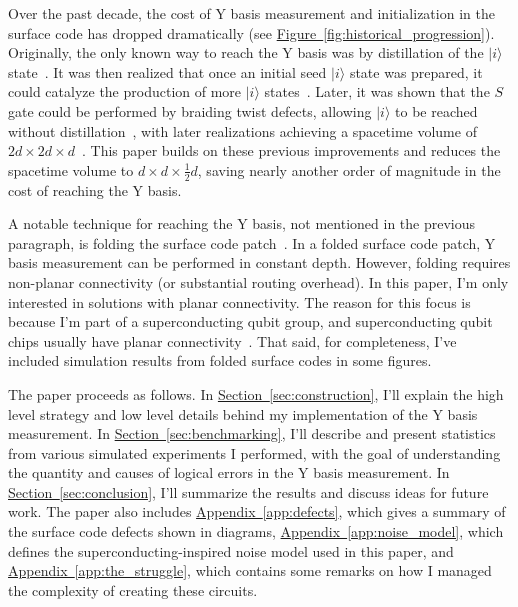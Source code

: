 \documentclass[onecolumn,unpublished,a4paper]{quantumarticle}
\theoremstyle{definition}
\theoremstyle{definition}
\theoremstyle{definition}
\renewcommand{\sec}[1]{\hyperref[sec:#1]{Section~\ref*{sec:#1}}}
\DeclareRobustCommand{\app}[1]{\hyperref[app:#1]{Appendix~\ref*{app:#1}}}
\newcommand{\fig}[1]{\hyperref[fig:#1]{Figure~\ref*{fig:#1}}}
\begin{document}
Over the past decade, the cost of Y basis measurement and initialization in the surface code has dropped dramatically (see \fig{historical_progression}).
Originally, the only known way to reach the Y basis was by distillation of the $|i\rangle$ state~\cite{aliferis2005quantum,fowler2012surfacecodereview,fowler2012bridge}.
It was then realized that once an initial seed $|i\rangle$ state was prepared, it could catalyze the production of more $|i\rangle$ states~\cite{fowler2012surfacecodereview,gidney2017slightly}.
Later, it was shown that the $S$ gate could be performed by braiding twist defects, allowing $|i\rangle$ to be reached without distillation~\cite{brown2017surfacetwists}, with later realizations achieving a spacetime volume of $2d \times 2d \times d$~\cite{bombin2021logical,chamberland2022universal}.
This paper builds on these previous improvements and reduces the spacetime volume to $d \times d \times \frac{1}{2}d$, saving nearly another order of magnitude in the cost of reaching the Y basis.

A notable technique for reaching the Y basis, not mentioned in the previous paragraph, is folding the surface code patch~\cite{moussa2016folded}.
In a folded surface code patch, Y basis measurement can be performed in constant depth.
However, folding requires non-planar connectivity (or substantial routing overhead).
In this paper, I'm only interested in solutions with planar connectivity.
The reason for this focus is because I'm part of a superconducting qubit group, and superconducting qubit chips usually have planar connectivity~\cite{Andersen2020,googlerepcode2021,Zhao2022}.
That said, for completeness, I've included simulation results from folded surface codes in some figures.

The paper proceeds as follows.
In \sec{construction}, I'll explain the high level strategy and low level details behind my implementation of the Y basis measurement.
In \sec{benchmarking}, I'll describe and present statistics from various simulated experiments I performed, with the goal of understanding the quantity and causes of logical errors in the Y basis measurement.
In \sec{conclusion}, I'll summarize the results and discuss ideas for future work.
The paper also includes \app{defects}, which gives a summary of the surface code defects shown in diagrams, \app{noise_model}, which defines the superconducting-inspired noise model used in this paper, and \app{the_struggle}, which contains some remarks on how I managed the complexity of creating these circuits.
\end{document}
